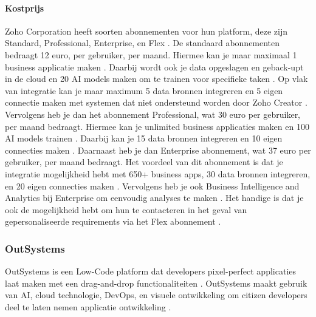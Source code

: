 \paragraph{Kostprijs}
Zoho Corporation heeft soorten abonnementen voor hun platform, deze zijn Standard, Professional, Enterprise, en Flex \autocite{ZohoCorporation2024}.
De standaard abonnementen bedraagt 12 euro, per gebruiker, per maand. Hiermee kan je maar maximaal 1 business applicatie maken \autocite{ZohoCorporation2024}.
Daarbij wordt ook je data opgeslagen en geback-upt in de cloud en 20 AI models maken om te trainen voor specifieke taken \autocite{ZohoCorporation2024}. Op vlak van integratie
kan je maar maximum 5 data bronnen integreren en 5 eigen connectie maken met systemen dat niet ondersteund worden door Zoho Creator \autocite{ZohoCorporation2024}. Vervolgens heb je dan het
abonnement Professional, wat 30 euro per gebruiker, per maand bedraagt. Hiermee kan je unlimited business applicaties maken en 100 AI models trainen \autocite{ZohoCorporation2024}. 
Daarbij kan je 15 data bronnen integreren en 10 eigen connecties maken \autocite{ZohoCorporation2024}. Daarnaast heb je dan Enterprise abonnement, wat 37 euro per gebruiker, per maand bedraagt.
Het voordeel van dit abonnement is dat je integratie mogelijkheid hebt met 650+ business apps, 30 data bronnen integreren, en 20 eigen connecties maken \autocite{ZohoCorporation2024}. Vervolgens heb je ook
Business Intelligence and Analytics bij Enterprise om eenvoudig analyses te maken \autocite{ZohoCorporation2024}. Het handige is dat je ook de mogelijkheid hebt om hun te contacteren in het geval 
van gepersonaliseerde requirements via het Flex abonnement \autocite{ZohoCorporation2024}.

\subsubsection*{OutSystems}
OutSystems is een Low-Code platform dat developers pixel-perfect applicaties laat maken met een drag-and-drop functionaliteiten \autocite{Ranosys2023} \autocite{Payne2023}.
OutSystems maakt gebruik van AI, cloud technologie, DevOps, en visuele ontwikkeling om citizen developers deel te laten nemen applicatie ontwikkeling \autocite{Ranosys2023}.

